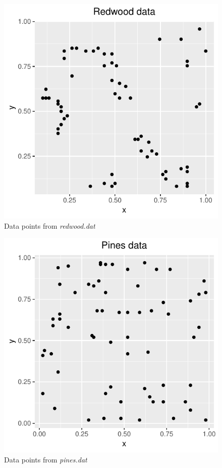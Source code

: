 \begin{figure}
    \centering
    \includegraphics[scale=0.95]{figures/prob1_redwood_points.pdf}
    \caption{Data points from \textit{redwood.dat}}
    \label{fig:redwood_points}
\end{figure}

\begin{figure}
    \centering
    \includegraphics[scale=0.95]{figures/prob1_pines_points.pdf}
    \caption{Data points from \textit{pines.dat}}
    \label{fig:pines_points}
\end{figure}

